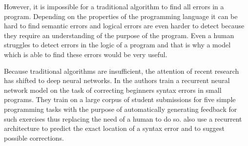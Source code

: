 However, it is impossible for a traditional algorithm to find all errors in a program. Depending on the properties of the programming language it can be hard to find semantic errors and logical errors are even harder to detect because they require an understanding of the purpose of the program. Even a human struggles to detect errors in the logic of a program and that is why a model which is able to find these errors would be very useful.

Because traditional algorithms are insufficient, the attention of recent research has shifted to deep neural networks. In \cite{programming_assignments_correction} the authors train a recurrent neural network model on the task of correcting beginners syntax errors in small programs. They train on a large corpus of student submissions for five simple programming tasks with the purpose of automatically generating feedback for such exercises thus replacing the need of a human to do so. \cite{rnn_syntax_correction} also use a recurrent architecture to predict the exact location of a syntax error and to suggest possible corrections.
